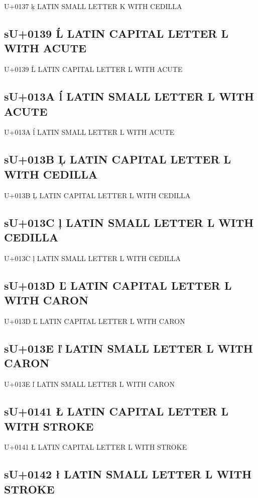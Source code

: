 U+0137 ķ  LATIN SMALL LETTER K WITH CEDILLA

\subsection{sU+0139 Ĺ  LATIN CAPITAL LETTER L WITH ACUTE}

U+0139 Ĺ  LATIN CAPITAL LETTER L WITH ACUTE

\subsection{sU+013A ĺ  LATIN SMALL LETTER L WITH ACUTE}

U+013A ĺ  LATIN SMALL LETTER L WITH ACUTE

\subsection{sU+013B Ļ  LATIN CAPITAL LETTER L WITH CEDILLA}

U+013B Ļ  LATIN CAPITAL LETTER L WITH CEDILLA

\subsection{sU+013C ļ  LATIN SMALL LETTER L WITH CEDILLA}

U+013C ļ  LATIN SMALL LETTER L WITH CEDILLA

\subsection{sU+013D Ľ  LATIN CAPITAL LETTER L WITH CARON}

U+013D Ľ  LATIN CAPITAL LETTER L WITH CARON

\subsection{sU+013E ľ  LATIN SMALL LETTER L WITH CARON}

U+013E ľ  LATIN SMALL LETTER L WITH CARON

\subsection{sU+0141 Ł  LATIN CAPITAL LETTER L WITH STROKE}

U+0141 Ł  LATIN CAPITAL LETTER L WITH STROKE

\subsection{sU+0142 ł  LATIN SMALL LETTER L WITH STROKE}

